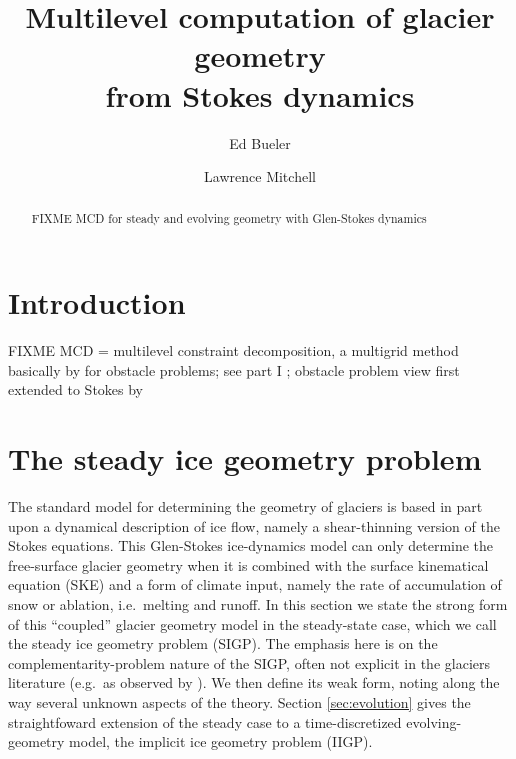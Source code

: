 \documentclass[letterpaper,final,12pt,reqno]{amsart}
\theoremstyle{claim}
\numberwithin{equation}{section}
\numberwithin{figure}{section}
\numberwithin{table}{section}
\numberwithin{theorem}{section}
\begin{document}
\title[Multilevel computation of glacier geometry from Stokes dynamics]{Multilevel computation of glacier geometry \\ from Stokes dynamics}

\author{Ed Bueler}

\author{Lawrence Mitchell}

\begin{abstract} FIXME MCD for steady and evolving geometry with Glen-Stokes dynamics
\end{abstract}

\maketitle


\thispagestyle{empty}

\section{Introduction} \label{sec:intro}

FIXME MCD = multilevel constraint decomposition, a multigrid \cite{Trottenbergetal2001} method basically by \cite{Tai2003} for obstacle problems; see part I \cite{Bueler2022};  obstacle problem view first extended to Stokes by \cite{WirbelJarosch2020}


\section{The steady ice geometry problem} \label{sec:stokesgeometry}

The standard model for determining the geometry of glaciers is based in part upon a dynamical description of ice flow, namely a shear-thinning version of the Stokes equations.  This Glen-Stokes ice-dynamics model can only determine the free-surface glacier geometry when it is combined with the surface kinematical equation (SKE) and a form of climate input, namely the rate of accumulation of snow or ablation, i.e.~melting and runoff.  In this section we state the strong form of this ``coupled'' glacier geometry model in the steady-state case, which we call the steady ice geometry problem (SIGP).  The emphasis here is on the complementarity-problem nature of the SIGP, often not explicit in the glaciers literature (e.g.~as observed by \cite{SchoofHewitt2013}).  We then define its weak form, noting along the way several unknown aspects of the theory.  Section \ref{sec:evolution} gives the straightfoward extension of the steady case to a time-discretized evolving-geometry model, the implicit ice geometry problem (IIGP).
\end{document}
